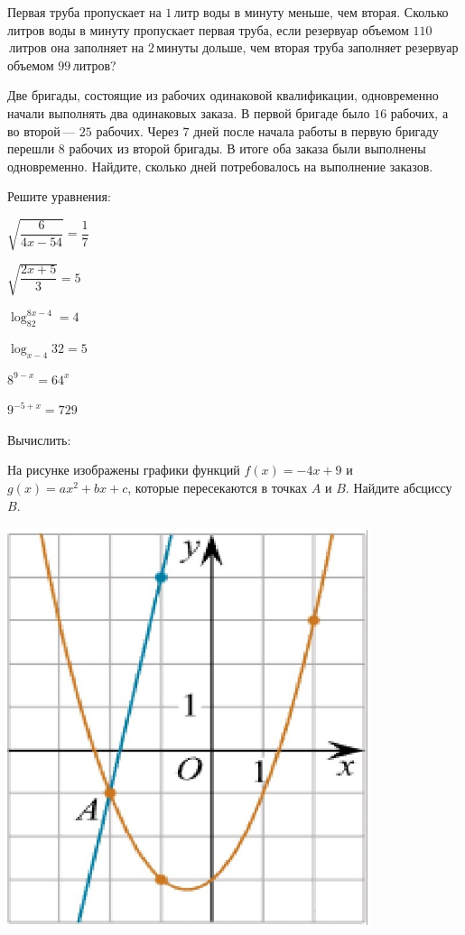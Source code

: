 \begin{listofex}
	\item Первая труба пропускает на \(1\) литр воды в минуту меньше, чем вторая. Сколько литров воды в минуту пропускает первая труба, если резервуар объемом \(110\) литров она заполняет на \(2\) минуты дольше, чем вторая труба заполняет резервуар объемом \(99\) литров?
	\item Две бригады, состоящие из рабочих одинаковой квалификации, одновременно начали выполнять два одинаковых заказа. В первой бригаде было \(16\) рабочих, а во второй — \(25\) рабочих. Через \(7\) дней после начала работы в первую бригаду перешли \(8\) рабочих из второй бригады. В итоге оба заказа были выполнены одновременно. Найдите, сколько дней потребовалось на выполнение заказов.
	\newpage
	\item Решите уравнения:
	\begin{enumcols}[itemcolumns=2]
		\item \( \sqrt{\dfrac{6}{4x-54}}=\dfrac{1}{7} \)
		\item \( \sqrt{\dfrac{2x+5}{3}}=5 \)
		\item \( \log_82^{8x-4}=4 \)
		\item \( \log_{x-4}32=5 \)
		\item \( 8^{9-x}=64^x\)
		\item \( 9^{-5+x}=729 \)
	\end{enumcols}
	\item Вычислить:
	\begin{enumcols}[itemcolumns=1]
		\item {}
		\item {}
	\end{enumcols}
	\item \begin{minipage}[t]{0.66\textwidth}
		На рисунке изображены графики функций \( f(x)=-4x+9 \) и \( g(x)=ax^2+bx+c \), которые пересекаются в точках \(A\) и \(B\). Найдите абсциссу  \( B \).
	\end{minipage}
	\begin{minipage}[c]{0.3\textwidth}
		\includegraphics[align=b, width=0.8\textwidth]{pics/G111M3H2-1}
	\end{minipage}
\end{listofex}
